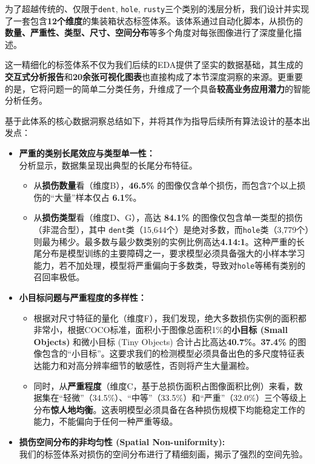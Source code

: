 \documentclass[
]{article}
\begin{document}
为了超越传统的、仅限于\texttt{dent}, \texttt{hole},
\texttt{rusty}三个类别的浅层分析，我们设计并实现了一套包含\textbf{12个维度}的集装箱状态标签体系。该体系通过自动化脚本，从损伤的\textbf{数量、严重性、类型、尺寸、空间分布}等多个角度对每张图像进行了深度量化描述。

这一精细化的标签体系不仅为我们后续的EDA提供了坚实的数据基础，其生成的\textbf{交互式分析报告}和\textbf{20余张可视化图表}也直接构成了本节深度洞察的来源。更重要的是，它将问题一的简单二分类任务，升维成了一个具备\textbf{较高业务应用潜力}的智能分析任务。

基于此体系的核心数据洞察总结如下，并将其作为指导后续所有算法设计的基本出发点：

\begin{itemize}
\item
  \textbf{严重的类别长尾效应与类型单一性：}\\
  分析显示，数据集呈现出典型的长尾分布特征。

  \begin{itemize}
  \item
    从\textbf{损伤数量}看（维度B），\textbf{46.5\%}
    的图像仅含单个损伤，而包含7个以上损伤的``大量''样本仅占
    \textbf{6.1\%}。
  \item
    从\textbf{损伤类型}看（维度D、G），高达 \textbf{84.1\%}
    的图像仅包含单一类型的损伤（非混合型），其中
    \texttt{dent}类（15,644个）是绝对多数，而\texttt{hole}类（3,779个）则最为稀少。最多数与最少数类别的实例比例高达\textbf{4.14:1}。这种严重的长尾分布是模型训练的主要障碍之一，要求模型必须具备强大的小样本学习能力，若不加处理，模型将严重偏向于多数类，导致对\texttt{hole}等稀有类别的召回率极低。
  \end{itemize}
\item
  \textbf{小目标问题与严重程度的多样性：}

  \begin{itemize}
  \item
    根据对尺寸特征的量化（维度F），我们发现，绝大多数损伤实例的面积都非常小，根据COCO标准，面积小于图像总面积1\%的\textbf{小目标
    (Small Objects)} 和微小目标 (Tiny Objects)
    合计占比高达\textbf{40.7\%}。\textbf{37.4\%}
    的图像包含的``小目标''。这要求我们的检测模型必须具备出色的多尺度特征表达能力和对高分辨率细节的敏感性，否则将产生大量漏检。
  \item
    同时，从\textbf{严重程度}（维度C，基于总损伤面积占图像面积比例）来看，数据集在``轻微''（34.5\%）、``中等''（33.5\%）和``严重''（32.0\%）三个等级上分布\textbf{惊人地均衡}。这表明模型必须具备在各种损伤规模下均能稳定工作的能力，不能偏向于任何一种严重等级。
  \end{itemize}
\item
  \textbf{损伤空间分布的非均匀性 (Spatial Non-uniformity):} \\
  我们的标签体系对损伤的空间分布进行了精细刻画，揭示了强烈的空间先验。


\end{itemize}
\end{document}
